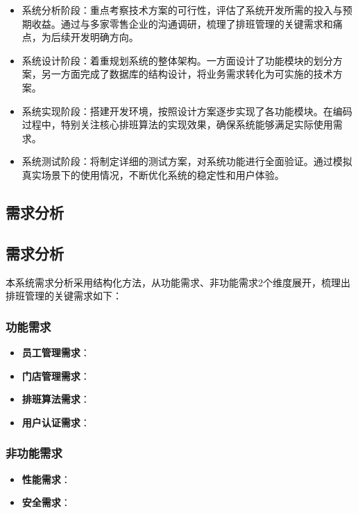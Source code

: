 \documentclass{ctexart}
\begin{document}
\begin{itemize}
    \item 系统分析阶段：重点考察技术方案的可行性，评估了系统开发所需的投入与预期收益。通过与多家零售企业的沟通调研，梳理了排班管理的关键需求和痛点，为后续开发明确方向。
    
    \item 系统设计阶段：着重规划系统的整体架构。一方面设计了功能模块的划分方案，另一方面完成了数据库的结构设计，将业务需求转化为可实施的技术方案。
    
    \item 系统实现阶段：搭建开发环境，按照设计方案逐步实现了各功能模块。在编码过程中，特别关注核心排班算法的实现效果，确保系统能够满足实际使用需求。
    
    \item 系统测试阶段：将制定详细的测试方案，对系统功能进行全面验证。通过模拟真实场景下的使用情况，不断优化系统的稳定性和用户体验。
\end{itemize}

\subsection{需求分析}
\subsection{需求分析}
本系统需求分析采用结构化方法，从功能需求、非功能需求2个维度展开，梳理出排班管理的关键需求如下：

\subsubsection{功能需求}
\begin{itemize}
    \item \textbf{员工管理需求}：

    \item \textbf{门店管理需求}：
    
    \item \textbf{排班算法需求}：
    
    \item \textbf{用户认证需求}：
\end{itemize}

\subsubsection{非功能需求}
\begin{itemize}
    \item \textbf{性能需求}：
    
    \item \textbf{安全需求}：
\end{itemize}
\end{document}
